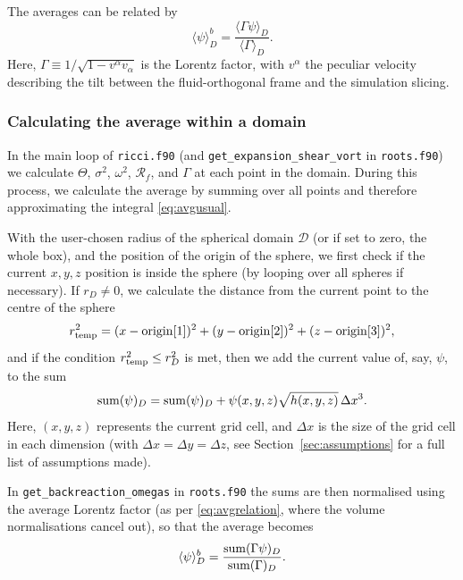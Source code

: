 \documentclass[a4paper]{article}
\newcommand{\alp}{\alpha}
\newcommand{\Gam}{\Gamma}
\begin{document}
The averages can be related by
\begin{equation} \label{eq:avgrelation}
	\langle\psi\rangle^b_D = \frac{\langle\Gam\psi\rangle_D}{\langle\Gam\rangle_D}.
\end{equation}
Here, $\Gam \equiv 1/ \sqrt{1-v^\alp v_\alp}$ is the Lorentz factor, with $v^\alp$ the peculiar velocity describing the tilt between the fluid-orthogonal frame and the simulation slicing.


\subsubsection{Calculating the average within a domain}

In the main loop of \texttt{ricci.f90} (and \texttt{get\_expansion\_shear\_vort} in \texttt{roots.f90}) we calculate $\Theta$, $\sigma^2$, $\omega^2$, $\mathcal{R}_f$, and $\Gamma$ at each point in the domain. During this process, we calculate the average by summing over all points and therefore approximating the integral \eqref{eq:avgusual}. 

With the user-chosen radius of the spherical domain $\mathcal{D}$ (or if set to zero, the whole box), and the position of the origin of the sphere, we first check if the current $x,y,z$ position is inside the sphere (by looping over all spheres if necessary). If $r_D \neq 0$, we calculate the distance from the current point to the centre of the sphere
\begin{equation}
	r_{\rm temp}^2 = (x - {\rm origin}[1])^2 + (y - {\rm origin}[2])^2 + (z - {\rm origin}[3])^2,
\end{equation}
and if the condition $r_{\rm temp}^2 \leq r_D^2$ is met, then we add the current value of, say, $\psi$, to the sum
\begin{equation}
	{\rm sum}(\psi)_D = {\rm sum}(\psi)_D + \psi(x,y,z) \sqrt{h(x,y,z)} \, \Delta x^3.
\end{equation}
Here, $(x,y,z)$ represents the current grid cell, and $\Delta x$ is the size of the grid cell in each dimension (with $\Delta x = \Delta y = \Delta z$, see Section~\ref{sec:assumptions} for a full list of assumptions made). 

In \texttt{get\_backreaction\_omegas} in \texttt{roots.f90} the sums are then normalised using the average Lorentz factor (as per \eqref{eq:avgrelation}, where the volume normalisations cancel out), so that the average becomes
\begin{align}
	\langle\psi\rangle^b_D = \frac{{\rm sum}(\Gam\psi)_D}{{\rm sum}(\Gam)_D}.
\end{align}
\end{document}
